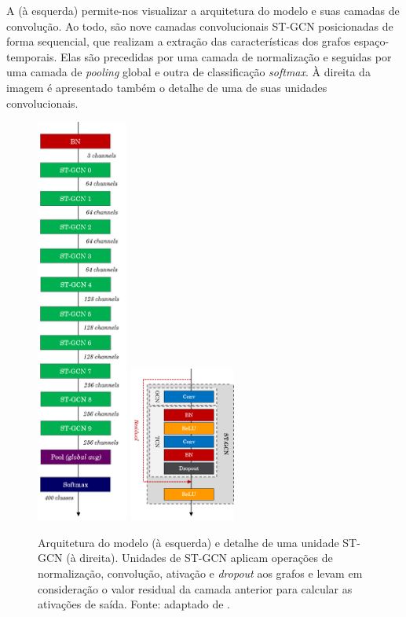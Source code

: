 
A  (à esquerda) permite-nos visualizar a arquitetura do modelo e suas camadas de convolução. Ao todo, são nove camadas convolucionais ST-GCN posicionadas de forma sequencial, que realizam a extração das características dos grafos espaço-temporais. Elas são precedidas por uma camada de normalização e seguidas por uma camada de \textit{pooling} global e outra de classificação \textit{softmax}. À direita da imagem é apresentado também o detalhe de uma de suas unidades convolucionais.

\begin{figure}[ht]
    \centering
    \includegraphics[width=3.0cm]{images/st_gcn_architecture}
    \includegraphics[width=3.5cm]{images/st_gcn_architeture_unit}
    \caption{Arquitetura do modelo (à esquerda) e detalhe de uma unidade ST-GCN (à direita). Unidades de ST-GCN aplicam operações de normalização, convolução, ativação e \textit{dropout} aos grafos e levam em consideração o valor residual da camada anterior para calcular as ativações de saída. Fonte: adaptado de \cite{st-gcn-2018}.}
    \label{fig:st-gcn-architecture}
\end{figure}


